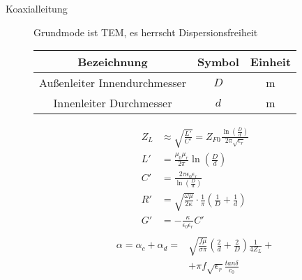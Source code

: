 \begin{description}
\item[Koaxialleitung] Grundmode ist TEM, es herrscht Dispersionsfreiheit
\begin{center}
\begin{tabular}{ccc} \toprule
Bezeichnung & Symbol & Einheit \\ \midrule
Außenleiter Innendurchmesser & $D$ &  \si{\meter}\\
Innenleiter Durchmesser & $d$ &  \si{\meter}\\
\bottomrule
\end{tabular}
\end{center}
\begin{center}
\begin{tikzpicture}[scale=0.2, every node/.style={scale=0.8}]

\end{tikzpicture}
\end{center}
\begin{align*}
Z_L &\approx \sqrt{\frac{L'}{C'}} = Z_{F0} \frac{\ln(\frac{D}{d})}{2\pi\sqrt{\epsilon_r}} \\
L' &= \frac{\mu_0 \mu_r}{2\pi} \ln\left(\frac{D}{d}\right) \\
C' &= \frac{2\pi \epsilon_0 \epsilon_r}{\ln \left(\frac{D}{d}\right)} \\ 
R' &= \sqrt{\frac{\omega \mu}{2 \kappa}} \cdot \frac{1}{\pi}\left( \frac{1}{D} + \frac{1}{d} \right) \\
G' &= - \frac{\kappa}{\epsilon_0 \epsilon_r} C' \\
\end{align*}
\begin{align*}
\alpha = \alpha_c + \alpha_d =& \sqrt{\frac{f \mu}{\sigma \pi}} \left( \frac{2}{d} + \frac{2}{D} \right) \frac{1}{4Z_L} + \\
&+ \pi f \sqrt{\epsilon_r} \frac{tan \delta}{c_0}
\end{align*}


\end{description}
